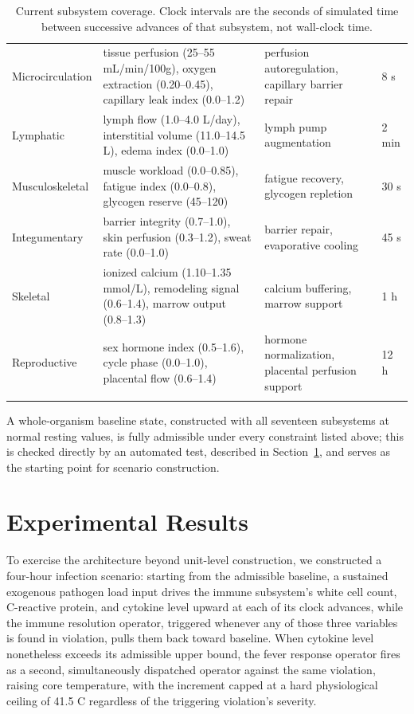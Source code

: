 \documentclass[11pt]{article}
\begin{document}
\begin{longtable}{@{}p{2.3cm}p{4.6cm}p{3.4cm}p{2.4cm}@{}}
Microcirculation & tissue perfusion (25--55 mL/min/100g), oxygen extraction (0.20--0.45), capillary leak index (0.0--1.2) & perfusion autoregulation, capillary barrier repair & 8 s \\
Lymphatic & lymph flow (1.0--4.0 L/day), interstitial volume (11.0--14.5 L), edema index (0.0--1.0) & lymph pump augmentation & 2 min \\
Musculoskeletal & muscle workload (0.0--0.85), fatigue index (0.0--0.8), glycogen reserve (45--120) & fatigue recovery, glycogen repletion & 30 s \\
Integumentary & barrier integrity (0.7--1.0), skin perfusion (0.3--1.2), sweat rate (0.0--1.0) & barrier repair, evaporative cooling & 45 s \\
Skeletal & ionized calcium (1.10--1.35 mmol/L), remodeling signal (0.6--1.4), marrow output (0.8--1.3) & calcium buffering, marrow support & 1 h \\
Reproductive & sex hormone index (0.5--1.6), cycle phase (0.0--1.0), placental flow (0.6--1.4) & hormone normalization, placental perfusion support & 12 h \\
\bottomrule
\caption{Current subsystem coverage. Clock intervals are the seconds of simulated time between successive advances of that subsystem, not wall-clock time.}
\label{tab:subsystems}
\end{longtable}

A whole-organism baseline state, constructed with all seventeen subsystems at normal resting values, is fully admissible under every constraint listed above; this is checked directly by an automated test, described in Section~\ref{sec:results}, and serves as the starting point for scenario construction.

\section{Experimental Results}
\label{sec:results}

To exercise the architecture beyond unit-level construction, we constructed a four-hour infection scenario: starting from the admissible baseline, a sustained exogenous pathogen load input drives the immune subsystem's white cell count, C-reactive protein, and cytokine level upward at each of its clock advances, while the immune resolution operator, triggered whenever any of those three variables is found in violation, pulls them back toward baseline. When cytokine level nonetheless exceeds its admissible upper bound, the fever response operator fires as a second, simultaneously dispatched operator against the same violation, raising core temperature, with the increment capped at a hard physiological ceiling of 41.5 \textdegree C regardless of the triggering violation's severity.
\end{document}
